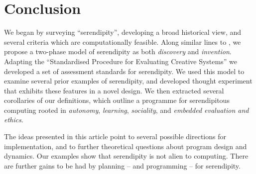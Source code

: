\section{Conclusion} \label{sec:conclusion}

%
We began by surveying ``serendipity'', developing a broad historical
view, and several criteria which are computationally feasible.  Along
similar lines to , we propose a two-phase
model of serendipity as both \emph{discovery} and \emph{invention}.
%
%
Adapting the ``Standardised Procedure for Evaluating Creative
Systems'' we developed a set of assessment standards for serendipity.
%
%
We used this model to examine several prior examples of serendipity,
and developed thought experiment that exhibits these features in a
novel design.
%
We then extracted several corollaries of our definitions, which
outline a programme for serendipitous computing rooted in
\emph{autonomy}, \emph{learning}, \emph{sociality}, and \emph{embedded
  evaluation and ethics}.


The ideas presented in this article point to several possible
directions for implementation, and to further theoretical questions
about program design and dynamics.  Our examples show that serendipity
is not alien to computing.  There are further gains to be had by
planning -- and programming -- for serendipity.
